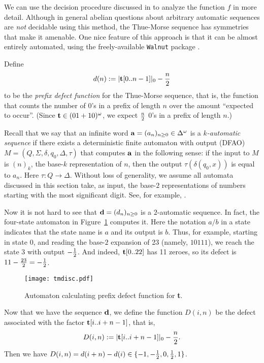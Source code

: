 \documentclass[11pt,reqno]{amsart}
\numberwithin{equation}{section}
\theoremstyle{plain}
\theoremstyle{definition}
\theoremstyle{remark}
\begin{document}
\medskip

\noindent We can use the decision procedure discussed in
\cite{Allouche&Rampersad&Shallit:2009,Charlier&Rampersad&Shallit:2012,Goc&Henshall&Shallit:2013,Goc&Mousavi&Shallit:2013,Shallit:2013} to analyze the function $f$
in more detail.
Although in general abelian questions about arbitrary
automatic sequences are {\it not\/} decidable using this method,
the Thue-Morse sequence has symmetries that make it
amenable.  One nice feature of this approach is that it can be almost
entirely automated, using the freely-available {\tt Walnut} package \cite{Mousavi:2016}.

Define
$$d(n) := |{\bf t}[0..n-1]|_0 - {n\over 2} $$
to be the {\it prefix defect function\/} for the Thue-Morse sequence,
that is, the function that counts
the number of $0$'s in a prefix of length $n$ over the amount
``expected to occur''.   (Since ${\bf t} \in (01+10)^\omega$,
we expect $n \over 2$ $0$'s in a prefix of length $n$.)

Recall that we say that an infinite word ${\bf a} = (a_n)_{n \geq 0} \in \Delta^\omega$ is
a {\it $k$-automatic sequence} if there exists a deterministic finite automaton with
output (DFAO) $M = (Q, \Sigma, \delta, q_0, \Delta, \tau)$ that computes $\bf a$
in the following sense:  if the input to $M$ is $(n)_k$, the base-$k$ representation of
$n$, then the output $\tau(\delta(q_0, x))$ is equal to $a_n$.  Here $\tau:Q 
\rightarrow \Delta$.  
Without loss of generality, we assume all automata discussed in this section
take, as input, the base-$2$ representations of numbers starting with the most
significant digit.
See, for example, \cite{Allouche&Shallit:2003}.

Now it is not hard to see that ${\bf d} = 
(d_n)_{n \geq 0}$ is a $2$-automatic sequence.  In fact,
the four-state automaton in Figure~\ref{tmdisc} computes it.  Here the notation
$a/b$ in a state indicates that the state name is $a$ and its output is $b$.
Thus, for example, starting in state $0$, and reading 
the base-$2$ expansion of 23 (namely, $10111$), we reach the state
$3$ with output $-{1 \over 2}$.  And indeed, ${\bf t}[0..22]$ has 11 zeroes,
so its defect is $11-{{23} \over 2} = -{1 \over 2}$.

\begin{figure}[H]
\centering
\texttt{[image: tmdisc.pdf]} 
\caption{Automaton calculating prefix defect function for {\bf t}.}
\label{tmdisc}
\end{figure}

Now that we have the sequence $\bf d$, 
we define the function $D(i,n)$ be the defect
associated with the factor ${\bf t}[i..i+n-1]$, that is,
$$
D(i,n)  := |{\bf t}[i..i+n-1]|_0 - {n \over 2}.$$
Then we have $D(i,n) = 
d(i+n) - d(i) \in \lbrace -1, -{1\over 2}, 0, {1 \over 2}, 1 \rbrace$.
\end{document}
